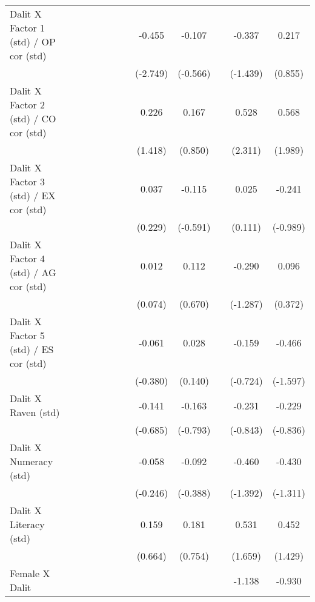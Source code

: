 {\begin{longtable}{@{\extracolsep{\fill}}lccccccccccc}
    Dalit X Factor 1 (std) / OP cor (std) &       &       &       &       &       &       & -0.455 & -0.107 &       & -0.337 & 0.217 \\
          &       &       &       &       &       &       & (-2.749) & (-0.566) &       & (-1.439) & (0.855) \\
    Dalit X Factor 2 (std) / CO cor (std) &       &       &       &       &       &       & 0.226 & 0.167 &       & 0.528 & 0.568 \\
          &       &       &       &       &       &       & (1.418) & (0.850) &       & (2.311) & (1.989) \\
    Dalit X Factor 3 (std) / EX cor (std) &       &       &       &       &       &       & 0.037 & -0.115 &       & 0.025 & -0.241 \\
          &       &       &       &       &       &       & (0.229) & (-0.591) &       & (0.111) & (-0.989) \\
    Dalit X Factor 4 (std) / AG cor (std) &       &       &       &       &       &       & 0.012 & 0.112 &       & -0.290 & 0.096 \\
          &       &       &       &       &       &       & (0.074) & (0.670) &       & (-1.287) & (0.372) \\
    Dalit X Factor 5 (std) / ES cor (std) &       &       &       &       &       &       & -0.061 & 0.028 &       & -0.159 & -0.466 \\
          &       &       &       &       &       &       & (-0.380) & (0.140) &       & (-0.724) & (-1.597) \\
    Dalit X Raven (std) &       &       &       &       &       &       & -0.141 & -0.163 &       & -0.231 & -0.229 \\
          &       &       &       &       &       &       & (-0.685) & (-0.793) &       & (-0.843) & (-0.836) \\
    Dalit X Numeracy (std) &       &       &       &       &       &       & -0.058 & -0.092 &       & -0.460 & -0.430 \\
          &       &       &       &       &       &       & (-0.246) & (-0.388) &       & (-1.392) & (-1.311) \\
    Dalit X Literacy (std) &       &       &       &       &       &       & 0.159 & 0.181 &       & 0.531 & 0.452 \\
          &       &       &       &       &       &       & (0.664) & (0.754) &       & (1.659) & (1.429) \\
    Female X Dalit &       &       &       &       &       &       &       &       &       & -1.138 & -0.930 \\

\end{longtable}}
